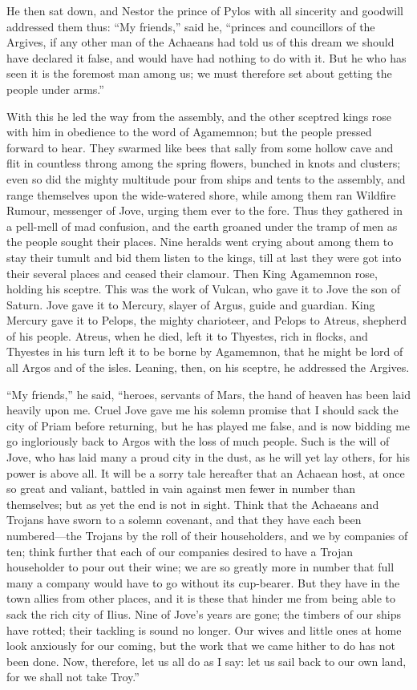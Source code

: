 He then sat down, and Nestor the prince of Pylos with all sincerity and
goodwill addressed them thus: “My friends,” said he, “princes and
councillors of the Argives, if any other man of the Achaeans had told us
of this dream we should have declared it false, and would have had nothing
to do with it. But he who has seen it is the foremost man among us; we
must therefore set about getting the people under arms.”

With this he led the way from the assembly, and the other sceptred kings
rose with him in obedience to the word of Agamemnon; but the people
pressed forward to hear. They swarmed like bees that sally from some
hollow cave and flit in countless throng among the spring flowers, bunched
in knots and clusters; even so did the mighty multitude pour from ships
and tents to the assembly, and range themselves upon the wide-watered
shore, while among them ran Wildfire Rumour, messenger of Jove, urging
them ever to the fore. Thus they gathered in a pell-mell of mad confusion,
and the earth groaned under the tramp of men as the people sought their
places. Nine heralds went crying about among them to stay their tumult and
bid them listen to the kings, till at last they were got into their
several places and ceased their clamour. Then King Agamemnon rose, holding
his sceptre. This was the work of Vulcan, who gave it to Jove the son of
Saturn. Jove gave it to Mercury, slayer of Argus, guide and guardian. King
Mercury gave it to Pelops, the mighty charioteer, and Pelops to Atreus,
shepherd of his people. Atreus, when he died, left it to Thyestes, rich in
flocks, and Thyestes in his turn left it to be borne by Agamemnon, that he
might be lord of all Argos and of the isles. Leaning, then, on his
sceptre, he addressed the Argives.

“My friends,” he said, “heroes, servants of Mars, the hand of heaven has
been laid heavily upon me. Cruel Jove gave me his solemn promise that I
should sack the city of Priam before returning, but he has played me
false, and is now bidding me go ingloriously back to Argos with the loss
of much people. Such is the will of Jove, who has laid many a proud city
in the dust, as he will yet lay others, for his power is above all. It
will be a sorry tale hereafter that an Achaean host, at once so great and
valiant, battled in vain against men fewer in number than themselves; but
as yet the end is not in sight. Think that the Achaeans and Trojans have
sworn to a solemn covenant, and that they have each been numbered—the
Trojans by the roll of their householders, and we by companies of ten;
think further that each of our companies desired to have a Trojan
householder to pour out their wine; we are so greatly more in number that
full many a company would have to go without its cup-bearer. But they have
in the town allies from other places, and it is these that hinder me from
being able to sack the rich city of Ilius. Nine of Jove’s years are gone;
the timbers of our ships have rotted; their tackling is sound no longer.
Our wives and little ones at home look anxiously for our coming, but the
work that we came hither to do has not been done. Now, therefore, let us
all do as I say: let us sail back to our own land, for we shall not take
Troy.”

